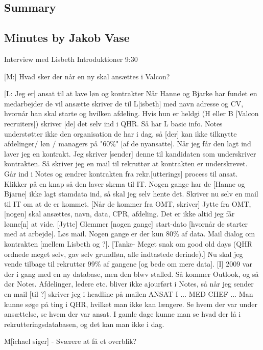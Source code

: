 \label{app:lisbeth}

\subsection{Summary}


\subsection{Minutes by Jakob Vase}

Interview med Lisbeth
Introduktioner
9:30

[M:] Hvad sker der når en ny skal ansættes i Valcon?

[L: Jeg er] ansat til at lave løn og kontrakter
Når Hanne og Bjarke har fundet en medarbejder de vil ansætte skriver de til L[isbeth] med navn adresse og CV, hvornår han skal starte og hvilken afdeling.
Hvis hun er heldgi (H eller B [Valcon recruiters]) skriver [de] det selv ind i QHR. Så har L basic info. Notes understøtter ikke den organisation de har i dag, så [der] kan ikke tilknytte afdelinger/ løn / managers på "60\%" [af de nyansatte]. Når jeg får den lagt ind laver jeg en kontrakt. Jeg skriver [sender] denne til kandidaten som underskriver kontrakten.
Så skriver jeg en mail til rekruttør at kontrakten er underskrevet. Går ind i Notes og ændrer kontrakten fra rekr.[utterings] process til ansat. Klikker på en knap så den laver skema til IT. Nogen gange har de [Hanne og Bjarne] ikke lagt stamdata ind, så skal jeg selv hente det.
Skriver nu selv en mail til IT om at de er kommet.
[Når de kommer fra OMT, skriver] Jytte fra OMT, [nogen] skal ansættes, navn, data, CPR, afdeling. Det er ikke altid jeg får lønne[n] at vide. [Jytte] Glemmer [nogen gange] start-dato [hvornår de starter med at arbejde]. Løs mail. Nogen gange er der kun 80\% af data.
Mail dialog om kontrakten [mellem Lisbeth og ?].
[Tanke- Meget snak om good old days (QHR ordnede meget selv, gav selv grundløn, alle indtastede derinde).]
Nu skal jeg vende tilbage til rekruttør 99\% af gangene [og bede om mere data].
[I] 2009 var der i gang med en ny database, men den blwv stalled. Så kommer Outlook, og så dør Notes. Afdelinger, ledere etc. bliver ikke ajourført i Notes, så når jeg sender en mail [til ?] skriver jeg i headline på mailen ANSAT I ... MED CHEF ...
Man kunne søge på ting i QHR, hvilket man ikke kan længere. Se hvem der var under ansættelse, se hvem der var ansat. I gamle dage kunne man se hvad der lå i rekrutteringsdatabasen, og det kan man ikke i dag.

M[ichael siger] - Sværere at få et overblik?

